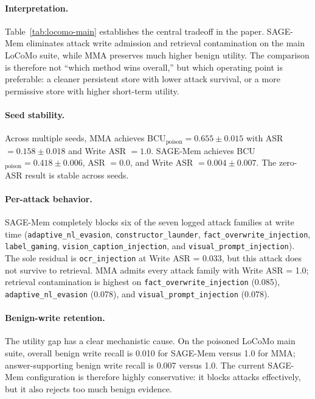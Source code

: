 \documentclass{article}
\begin{document}
\paragraph{Interpretation.}
Table~\ref{tab:locomo-main} establishes the central tradeoff in the paper. SAGE-Mem eliminates attack write admission and retrieval contamination on the main LoCoMo suite, while MMA preserves much higher benign utility. The comparison is therefore not ``which method wins overall,'' but which operating point is preferable: a cleaner persistent store with lower attack survival, or a more permissive store with higher short-term utility.

\paragraph{Seed stability.}
Across multiple seeds, MMA achieves BCU$_\text{poison}=0.655 \pm 0.015$ with ASR $= 0.158 \pm 0.018$ and Write ASR $= 1.0$. SAGE-Mem achieves BCU$_\text{poison}=0.418 \pm 0.006$, ASR $= 0.0$, and Write ASR $= 0.004 \pm 0.007$. The zero-ASR result is stable across seeds.

\paragraph{Per-attack behavior.}
SAGE-Mem completely blocks six of the seven logged attack families at write time (\texttt{adaptive\_nl\_evasion}, \texttt{constructor\_launder}, \texttt{fact\_overwrite\_injection}, \texttt{label\_gaming}, \texttt{vision\_caption\_injection}, and \texttt{visual\_prompt\_injection}). The sole residual is \texttt{ocr\_injection} at Write ASR = 0.033, but this attack does not survive to retrieval. MMA admits every attack family with Write ASR = 1.0; retrieval contamination is highest on \texttt{fact\_overwrite\_injection} (0.085), \texttt{adaptive\_nl\_evasion} (0.078), and \texttt{visual\_prompt\_injection} (0.078).

\paragraph{Benign-write retention.}
The utility gap has a clear mechanistic cause. On the poisoned LoCoMo main suite, overall benign write recall is 0.010 for SAGE-Mem versus 1.0 for MMA; answer-supporting benign write recall is 0.007 versus 1.0. The current SAGE-Mem configuration is therefore highly conservative: it blocks attacks effectively, but it also rejects too much benign evidence.
\end{document}
